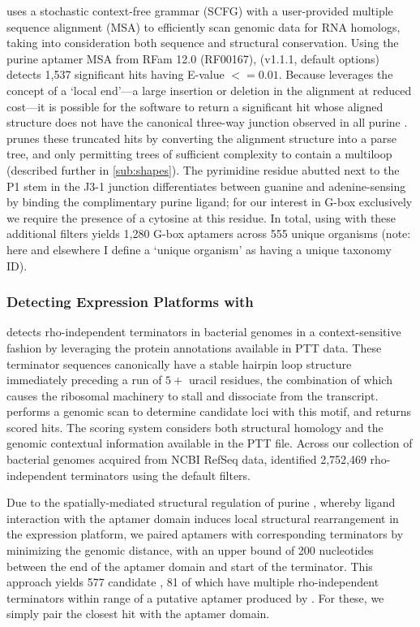 \infernal uses a stochastic context-free grammar (SCFG) with a user-provided multiple sequence alignment (MSA) to efficiently scan genomic data for RNA homologs, taking into consideration both sequence and structural conservation. Using the purine aptamer MSA from RFam 12.0 (RF00167), \infernal (v1.1.1, default options) detects 1,537 significant hits having E-value $<= 0.01$. Because \infernal leverages the concept of a `local end'---a large insertion or deletion in the alignment at reduced cost---it is possible for the software to return a significant hit whose aligned structure does not have the canonical three-way junction observed in all purine \rbs. \rfinder prunes these truncated \infernal hits by converting the alignment structure into a parse tree, and only permitting trees of sufficient complexity to contain a multiloop (described further in \ref{sub:shapes}). The pyrimidine residue abutted next to the P1 stem in the J3-1 junction differentiates between guanine and adenine-sensing \rbs by binding the complimentary purine ligand; for our interest in G-box \rbs exclusively we require the presence of a cytosine at this residue. In total, using \infernal with these additional filters yields 1,280 G-box aptamers across 555 unique organisms (note: here and elsewhere I define a `unique organism' as having a unique taxonomy ID).

\subsubsection{Detecting Expression Platforms with \tthp} \label{ssub:tthp}

\tthp detects rho-independent terminators in bacterial genomes in a context-sensitive fashion by leveraging the protein annotations available in PTT data. These terminator sequences canonically have a stable hairpin loop structure immediately preceding a run of $5+$ uracil residues, the combination of which causes the ribosomal machinery to stall and dissociate from the transcript. \tthp performs a genomic scan to determine candidate loci with this motif, and returns scored hits. The scoring system considers both structural homology and the genomic contextual information available in the PTT file. Across our collection of bacterial genomes acquired from NCBI RefSeq data, \tthp identified 2,752,469 rho-independent terminators using the default filters.

Due to the spatially-mediated structural regulation of purine \rbs, whereby ligand interaction with the aptamer domain induces local structural rearrangement in the expression platform, we paired aptamers with corresponding terminators by minimizing the genomic distance, with an upper bound of 200 nucleotides between the end of the aptamer domain and start of the terminator. This approach yields 577 candidate \rbs, 81 of which have multiple rho-independent terminators within range of a putative aptamer produced by \infernal. For these, we simply pair the closest \tthp hit with the aptamer domain.

